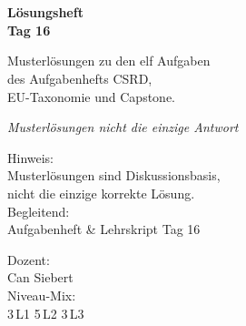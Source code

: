 \documentclass[11pt,a4paper,oneside]{article}
\newcommand{\caveatfontfallback}{\itshape}
\newcommand\caveatfont{\caveatfontfallback}%
\begin{document}
\begin{titlepage}
  \pagestyle{empty}
  \vspace*{1.5cm}
  \\[2pt]
  \noindent{\color{lpAccent}\rule{\linewidth}{1.2pt}}\\[4pt]

  \vspace{3cm}
  {\sffamily\fontsize{30}{34}\selectfont\bfseries\color{lpInk}L\"osungsheft\\Tag 16\par}

  \vspace{0.7cm}
  {\sffamily\large\color{lpGray}Musterl\"osungen zu den elf Aufgaben\\des Aufgabenhefts \textendash{} CSRD,\\EU-Taxonomie und Capstone.\par}

  \vspace{1.5cm}
  {\caveatfont\LARGE\color{lpGreen}Musterl\"osungen \textperiodcentered{} nicht die einzige Antwort}\par

  \vfill

  \noindent\begin{minipage}{0.55\linewidth}
    {\sffamily\footnotesize\color{lpGray}Hinweis:}\\
    {\sffamily\small\color{lpInk}Musterl\"osungen sind Diskussionsbasis,\\nicht die einzige korrekte L\"osung.}\\[10pt]
    {\sffamily\footnotesize\color{lpGray}Begleitend:}\\
    {\sffamily\small\color{lpInk}Aufgabenheft \& Lehrskript Tag 16}
  \end{minipage}\hfill
  \begin{minipage}{0.4\linewidth}
    \raggedleft
    {\sffamily\footnotesize\color{lpGray}Dozent:}\\
    {\sffamily\small\color{lpInk}Can Siebert}\\[10pt]
    {\sffamily\footnotesize\color{lpGray}Niveau-Mix:}\\
    {\sffamily\small\color{lpInk}3\,L1 \textperiodcentered{} 5\,L2 \textperiodcentered{} 3\,L3}
  \end{minipage}

  \vspace{0.5cm}
  \noindent{\color{lpAccent}\rule{\linewidth}{0.6pt}}
\end{titlepage}
\end{document}
